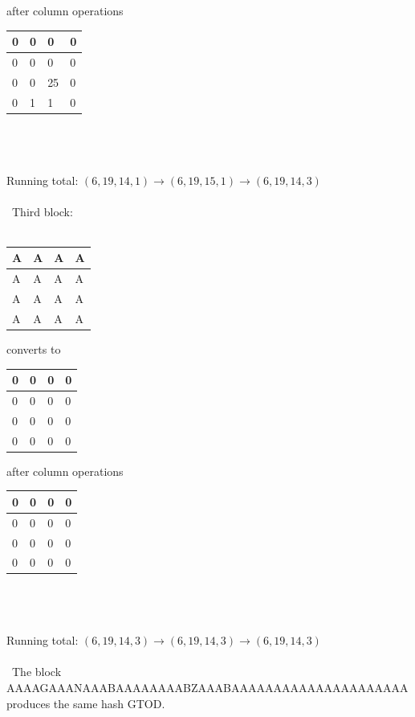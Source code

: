 \documentclass[a4paper]{article}
\begin{document}
\quad
after column operations
\quad
\begin{tabular}{|l|l|l|l|}
\hline
0 & 0 & 0 & 0 \\ \hline
0 & 0 & 0 &0 \\ \hline
0 & 0 & 25 &0 \\ \hline
0 & 1 & 1 & 0 \\ \hline
\end{tabular}
\\\\\\Running total: $(6, 19, 14, 1) \rightarrow (6, 19, 15, 1) \rightarrow (6, 19, 14, 3)$\\\\\
Third block:\\\\
\begin{tabular}{|l|l|l|l|}
\hline
A & A & A & A \\ \hline
A & A & A & A \\ \hline
A & A & A & A \\ \hline
A & A & A & A \\ \hline
\end{tabular}
\quad
converts to 
\quad
\begin{tabular}{|l|l|l|l|}
\hline
0 & 0 & 0 & 0 \\ \hline
0 & 0 & 0 &0 \\ \hline
0 & 0 & 0 &0 \\ \hline
0 & 0 & 0 & 0 \\ \hline
\end{tabular}
\quad
after column operations
\quad
\begin{tabular}{|l|l|l|l|}
\hline
0 & 0 & 0 & 0 \\ \hline
0 & 0 & 0 &0 \\ \hline
0 & 0 & 0 &0 \\ \hline
0 & 0 & 0 & 0 \\ \hline
\end{tabular}
\\\\\\Running total: $(6, 19, 14, 3) \rightarrow (6, 19, 14, 3) \rightarrow (6, 19, 14, 3)$\\\\\
The block AAAAGAAANAAABAAAAAAAABZAAABAAAAAAAAAAAAAAAAAAAAA produces the same hash GTOD.
\end{document}
